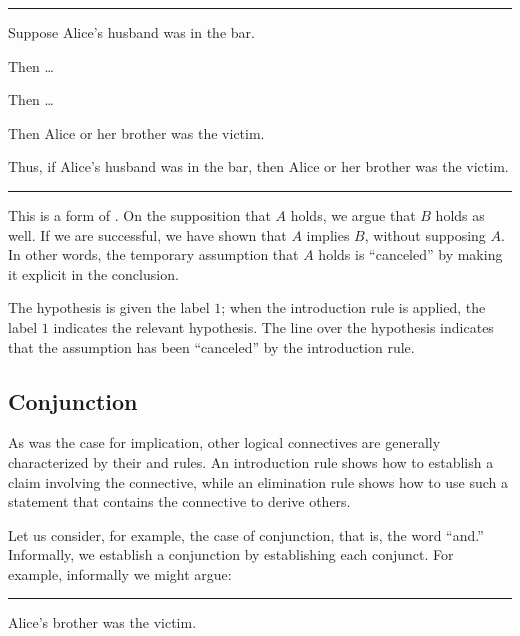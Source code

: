 \documentclass[letterpaper,10pt,english]{sphinxmanual}
\begin{document}
\bigskip\hrule\bigskip


\sphinxAtStartPar
Suppose Alice’s husband was in the bar.

\sphinxAtStartPar
Then …

\sphinxAtStartPar
Then …

\sphinxAtStartPar
Then Alice or her brother was the victim.

\sphinxAtStartPar
Thus, if Alice’s husband was in the bar, then Alice or her brother was the victim.


\bigskip\hrule\bigskip


\sphinxAtStartPar
This is a form of . On the supposition that \(A\) holds, we argue that \(B\) holds as well. If we are successful, we have shown that \(A\) implies \(B\), without supposing \(A\). In other words, the temporary assumption that \(A\) holds is “canceled” by making it explicit in the conclusion.



\begin{center}
\AXM{}
\noLine
\UIM{\vdots}
\noLine
{}
\DP
\end{center}

\sphinxAtStartPar
The hypothesis is given the label \(1\); when the introduction rule is applied, the label \(1\) indicates the relevant hypothesis. The line over the hypothesis indicates that the assumption has been “canceled” by the introduction rule.


\subsection{Conjunction}
\label{\detokenize{propositional_logic:conjunction}}
\sphinxAtStartPar
As was the case for implication, other logical connectives are generally characterized by their  and  rules. An introduction rule shows how to establish a claim involving the connective, while an elimination rule shows how to use such a statement that contains the connective to derive others.

\sphinxAtStartPar
Let us consider, for example, the case of conjunction, that is, the word “and.” Informally, we establish a conjunction by establishing each conjunct. For example, informally we might argue:


\bigskip\hrule\bigskip


\sphinxAtStartPar
Alice’s brother was the victim.
\end{document}
